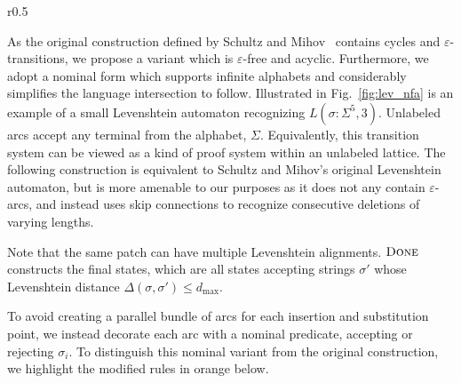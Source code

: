\documentclass[sigplan,review,acmsmall,nonacm,screen,anonymous]{acmart}\settopmatter{printfolios=false,printccs=false,printacmref=false}
\begin{document}
\begin{wrapfigure}{r}{0.5\textwidth}
  \vspace{-0.3cm}
  \begin{center}
    
  \end{center}
  \caption{NFA recognizing Levenshtein $L(\sigma: \Sigma^5, 3)$.}\label{fig:lev_nfa}
  \vspace{-0.5cm}
\end{wrapfigure}

As the original construction defined by Schultz and Mihov~\cite{schulz2002fast} contains cycles and $\varepsilon$-transitions, we propose a variant which is $\varepsilon$-free and acyclic. Furthermore, we adopt a nominal form which supports infinite alphabets and considerably simplifies the language intersection to follow. Illustrated in Fig.~\ref{fig:lev_nfa} is an example of a small Levenshtein automaton recognizing $L(\sigma: \Sigma^5, 3)$. Unlabeled arcs accept any terminal from the alphabet, $\Sigma$. Equivalently, this transition system can be viewed as a kind of proof system within an unlabeled lattice. The following construction is equivalent to Schultz and Mihov's original Levenshtein automaton, but is more amenable to our purposes as it does not any contain $\varepsilon$-arcs, and instead uses skip connections to recognize consecutive deletions of varying lengths.




Note that the same patch can have multiple Levenshtein alignments. $\textsc{Done}$ constructs the final states, which are all states accepting strings $\sigma'$ whose Levenshtein distance $\Delta(\sigma, \sigma') \leq d_\max$.

To avoid creating a parallel bundle of arcs for each insertion and substitution point, we instead decorate each arc with a nominal predicate, accepting or rejecting $\sigma_i$. To distinguish this nominal variant from the original construction, we highlight the modified rules in orange below.

\end{document}

